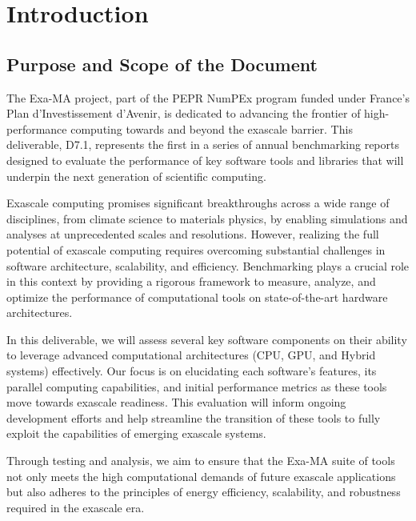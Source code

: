 
\clearpage
\section{Introduction}
\label{sec:introduction}


\subsection{Purpose and Scope of the Document}
\label{sec:purpose}

The Exa-MA project, part of the PEPR NumPEx program funded under France’s Plan d’Investissement d’Avenir, is dedicated to advancing the frontier of high-performance computing towards and beyond the exascale barrier. 
This deliverable, D7.1, represents the first in a series of annual benchmarking reports designed to evaluate the performance of key software tools and libraries that will underpin the next generation of scientific computing.

Exascale computing promises significant breakthroughs across a wide range of disciplines, from climate science to materials physics, by enabling simulations and analyses at unprecedented scales and resolutions. 
However, realizing the full potential of exascale computing requires overcoming substantial challenges in software architecture, scalability, and efficiency. 
Benchmarking plays a crucial role in this context by providing a rigorous framework to measure, analyze, and optimize the performance of computational tools on state-of-the-art hardware architectures.

In this deliverable, we will assess several key software components on their ability to leverage advanced computational architectures (CPU, GPU, and Hybrid systems) effectively. 
Our focus is on elucidating each software’s features, its parallel computing capabilities, and initial performance metrics as these tools move towards exascale readiness. 
This evaluation will inform ongoing development efforts and help streamline the transition of these tools to fully exploit the capabilities of emerging exascale systems.

Through testing and analysis, we aim to ensure that the Exa-MA suite of tools not only meets the high computational demands of future exascale applications but also adheres to the principles of energy efficiency, scalability, and robustness required in the exascale era.


